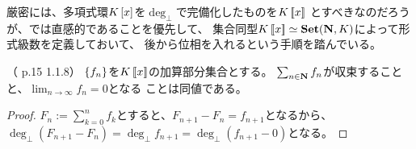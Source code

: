 {	厳密には、多項式環$K\mathinner{[{x}]}$を$\deg_\bot$で完備化したものを$K\mathinner{[\![{x}]\!]}$
	とすべきなのだろうが、\cite{stanley-1}では直感的であることを優先して、
	集合同型$K\mathinner{[\![{x}]\!]}\simeq{\mathbf{Set}}(\mathbf{N},K)$によって形式級数を定義しておいて、
	後から位相を入れるという手順を踏んでいる。

	\begin{proposition}[形式級数の収束その一]\label{prop:形式級数の収束その一} %
		（\cite{stanley-1} p.15 1.1.8）
		$\mathinner{\{{f_n}\}}$を$K\mathinner{[\![{x}]\!]}$の加算部分集合とする。
		$\sum_{n\in\mathbf{N}}f_n$が収束することと、$\lim_{n\to\infty}f_n=0$となる
		ことは同値である。\EOP
	\end{proposition} %
	\begin{proof} %
		$F_n:=\sum_{k=0}^n f_k$とすると、$F_{n+1}-F_n=f_{n+1}$となるから、
		$\deg_\bot(F_{n+1}-F_n)=\deg_\bot f_{n+1}=\deg_\bot(f_{n+1}-0)$となる。
	\end{proof} %

}
